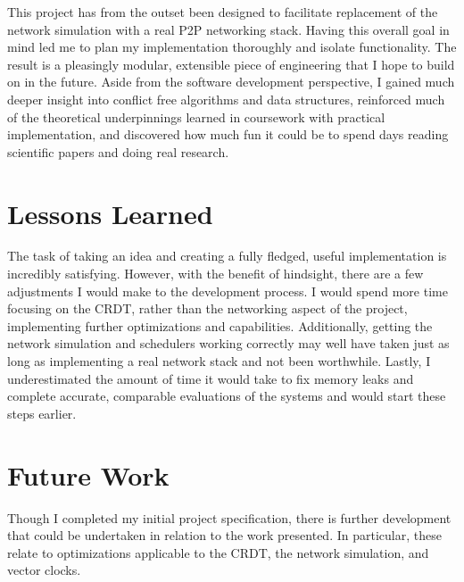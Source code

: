 \documentclass[12pt,a4paper,twoside,openright]{report}
\begin{document}
This project has from the outset been designed to facilitate replacement of the network simulation with a real P2P networking stack. Having this overall goal in mind led me to plan my implementation thoroughly and isolate functionality. The result is a pleasingly modular, extensible piece of engineering that I hope to build on in the future. Aside from the software development perspective, I gained much deeper insight into conflict free algorithms and data structures, reinforced much of the theoretical underpinnings learned in coursework with practical implementation, and discovered how much fun it could be to spend days reading scientific papers and doing real research.

\section{Lessons Learned}
The task of taking an idea and creating a fully fledged, useful implementation is incredibly satisfying. However, with the benefit of hindsight, there are a few adjustments I would make to the development process. I would spend more time focusing on the CRDT, rather than the networking aspect of the project, implementing further optimizations and capabilities. Additionally, getting the network simulation and schedulers working correctly may well have taken just as long as implementing a real network stack and not been worthwhile. Lastly, I underestimated the amount of time it would take to fix memory leaks and complete accurate, comparable evaluations of the systems and would start these steps earlier.


\section{Future Work} \label{sec:futurework}

Though I completed my initial project specification, there is further development that could be undertaken in relation to the work presented. In particular, these relate to optimizations applicable to the CRDT, the network simulation, and vector clocks.
\end{document}
